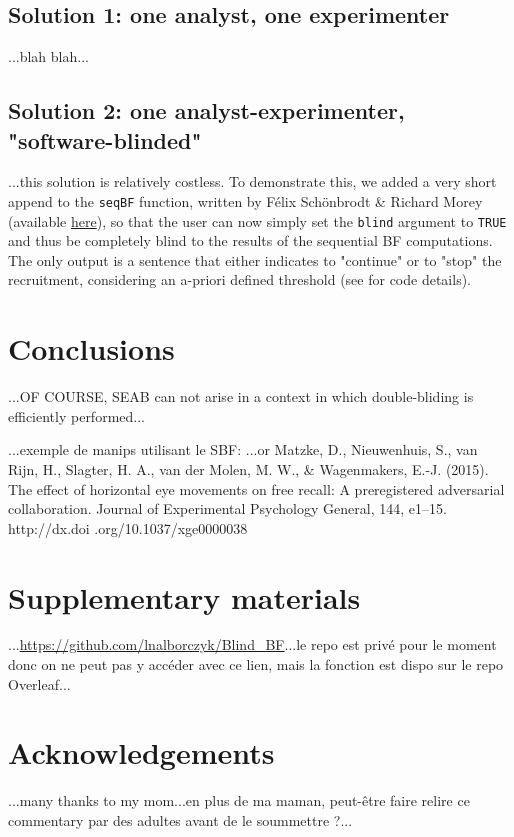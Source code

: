 \documentclass[a4paper,man,natbib,floatsintext,donotrepeattitle]{apa6}
\begin{document}
\subsection{Solution 1: one analyst, one experimenter}

...blah blah...

\subsection{Solution 2: one analyst-experimenter, "software-blinded"}

...this solution is relatively costless. To demonstrate this, we added a very short append to the \texttt{seqBF} function, written by Félix Schönbrodt \& Richard Morey (available \href{https://raw.githubusercontent.com/richarddmorey/BayesFactorExtras/master/BayesFactorExtras/R/seqBF.R}{here}), so that the user can now simply set the \texttt{blind} argument to \texttt{TRUE} and thus be completely blind to the results of the sequential BF computations. The only output is a sentence that either indicates to "continue" or to "stop" the recruitment, considering an a-priori defined threshold (see  for code details).

\section{Conclusions}

...OF COURSE, SEAB can not arise in a context in which double-bliding is efficiently performed...

...exemple de manips utilisant le SBF: \cite{martin_perceiving_2016}...or Matzke, D., Nieuwenhuis, S., van Rijn, H., Slagter, H. A., van der Molen, M. W., \& Wagenmakers, E.-J. (2015). The effect of horizontal eye movements on free recall: A preregistered adversarial collaboration. Journal of Experimental Psychology General, 144, e1–15. http://dx.doi .org/10.1037/xge0000038

\section{Supplementary materials}\label{sec:supp}

...\url{https://github.com/lnalborczyk/Blind_BF}...le repo est privé pour le moment donc on ne peut pas y accéder avec ce lien, mais la fonction est dispo sur le repo Overleaf...

\section{Acknowledgements}

...many thanks to my mom...en plus de ma maman, peut-être faire relire ce commentary par des adultes avant de le soummettre ?...


\end{document}
